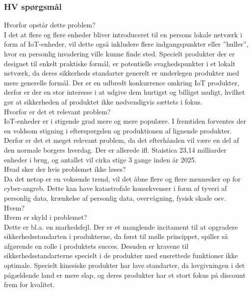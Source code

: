         \subsubsection{HV spørgsmål}
        Hvorfor opstår dette problem?\\
        I det at flere og flere enheder bliver introduceret til en persons lokale netværk i form af IoT-enheder, vil dette også inkludere flere indgangspunkter eller ”huller”, hvor en personlig invadering ville kunne finde sted. Specielt produkter der er designet til enkelt praktiske formål, er potentielle svaghedspunkter i et lokalt netværk, da deres sikkerheds standarter generelt er underlegen produkter med mere generelle formål. Der er en udbredt konkurrence omkring IoT produkter, derfor er der en stor interesse i at udgive dem hurtigst og billigst muligt, hvilket gør at sikkerheden af produktet ikke nødvendigvis sættets i fokus.\\

        Hvorfor er det et relevant problem? \\
        IoT-enheder er i stigende grad mere og mere populære. I fremtiden forventes der en voldsom stigning i efterspørgslen og produktionen af lignende produkter. Derfor er det et meget relevant problem, da det efterhånden vil være en del af den normale borgers hverdag. Der er allerede ifl. Staistica 23,14 milliarder enheder i brug, og antallet vil cirka stige 3 gange inden år 2025.\\
        
        Hvad sker der hvis problemet ikke løses?\\
        Da det netop er en voksende trend, vil det åbne flere og flere mennesker op for cyber-angreb. Dette kan have katastrofale konsekvenser i form af tyveri af personlig data, krænkelse af personlig data, overvågning, fysisk skade osv.\\ 
        
        Hvem?\\
        Hvem er skyld i problemet?\\
        Dette er bl.a. en markedsfejl. Der er et manglende incitament til at opgradere sikkerhedsstandarten i produkterne, da først til mølle princippet, spiller så afgørende en rolle i produktets succes. Desuden er kravene til sikkerhedsstandarterne specielt i de produkter med ensrettede funktioner ikke optimale. Specielt kinesiske produkter har lave standarter, da lovgivningen i det pågældende land er mere slap, og deres produkter har et stort fokus på discount frem for kvalitet.\\
        
